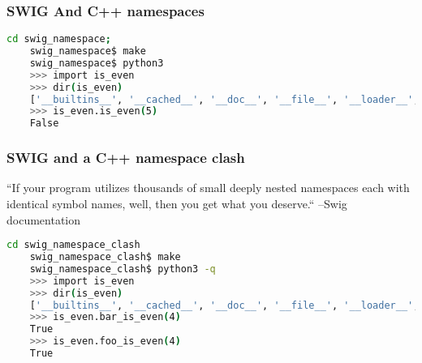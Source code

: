 \documentclass{beamer}
\begin{document}
\begin{frame}[fragile]
  \frametitle{SWIG And C++ namespaces}
  \begin{lstlisting}[language=bash]
    cd swig_namespace;
    swig_namespace$ make
    swig_namespace$ python3
    >>> import is_even
    >>> dir(is_even)
    ['__builtins__', '__cached__', '__doc__', '__file__', '__loader__', '__name__', '__package__', '__spec__', '_is_even', '_newclass', '_object', '_swig      _getattr', '_swig_getattr_nondynamic', '_swig_property', '_swig_repr', '_swig_setattr', '_swig_setattr_nondynamic', 'is_even']
    >>> is_even.is_even(5)
    False
  \end{lstlisting}
\end{frame}

\begin{frame}[fragile]
  \frametitle{SWIG and a C++ namespace clash}
  ``If your program utilizes thousands of small deeply nested namespaces each with identical symbol names, well, then
  you get what you deserve.`` --Swig documentation
  \begin{lstlisting}[language=bash]
    cd swig_namespace_clash
    swig_namespace_clash$ make
    swig_namespace_clash$ python3 -q
    >>> import is_even
    >>> dir(is_even)
    ['__builtins__', '__cached__', '__doc__', '__file__', '__loader__', '__name__', '__package__', '__spec__', '_is_even', '_newclass', '_object', '_swig_getattr', '_swig_getattr_nondynamic', '_swig_property', '_swig_repr', '_swig_setattr', '_swig_setattr_nondynamic', 'bar_is_even', 'foo_is_even']
    >>> is_even.bar_is_even(4)
    True
    >>> is_even.foo_is_even(4)
    True
   \end{lstlisting}
\end{frame}
\end{document}
